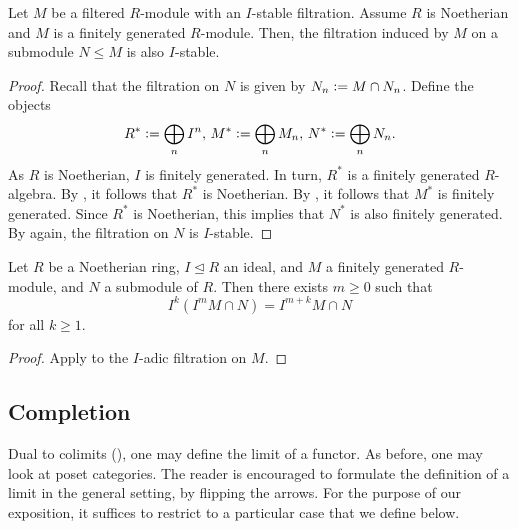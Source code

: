 \begin{prop} \label{prop:artin-rees}
	Let $M$ be a filtered $R$-module with an $I$-stable filtration. Assume $R$ is Noetherian and $M$ is a finitely generated $R$-module. Then, the filtration induced by $M$ on a submodule $N \le M$ is also $I$-stable.
\end{prop}
\begin{proof} 
	Recall that the filtration on $N$ is given by $N_{n} \vcentcolon= M \cap N_{n}$. Define the objects
	\begin{equation*} 
		R^{\ast} \vcentcolon= \bigoplus_{n} I^{n},\, M^{\ast} \vcentcolon= \bigoplus_{n} M_{n},\, N^{\ast} \vcentcolon= \bigoplus_{n} N_{n}.
	\end{equation*}
	As $R$ is Noetherian, $I$ is finitely generated. In turn, $R^{\ast}$ is a finitely generated $R$-algebra. By , it follows that $R^{\ast}$ is Noetherian. By , it follows that $M^{\ast}$ is finitely generated. Since $R^{\ast}$ is Noetherian, this implies that $N^{\ast}$ is also finitely generated. By  again, the filtration on $N$ is $I$-stable.
\end{proof}

\begin{cor} \label{cor:artin-rees}
	Let $R$ be a Noetherian ring, $I \unlhd R$ an ideal, and $M$ a finitely generated $R$-module, and $N$ a submodule of $R$. Then there exists $m \ge 0$ such that
	\begin{equation*} 
		I^{k}(I^{m} M \cap N) = I^{m + k} M \cap N
	\end{equation*}
	for all $k \ge 1$.
\end{cor}
\begin{proof} 
	Apply  to the $I$-adic filtration on $M$.
\end{proof}

\subsection{Completion}

Dual to colimits (), one may define the limit of a functor. As before, one may look at poset categories. The reader is encouraged to formulate the definition of a limit in the general setting, by flipping the arrows. For the purpose of our exposition, it suffices to restrict to a particular case that we define below.

